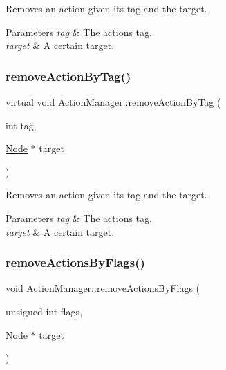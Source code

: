 Removes an action given its tag and the target.


\begin{DoxyParams}{Parameters}
{\em tag} & The action\textquotesingle{}s tag. \\
\hline
{\em target} & A certain target. \\
\hline
\end{DoxyParams}
\mbox{\label{classActionManager_a69aa53f99fdfdc4777119fb4a415cf81}} 
\subsubsection{\texorpdfstring{remove\+Action\+By\+Tag()}{removeActionByTag()}\hspace{0.1cm}{\footnotesize\ttfamily [2/2]}}
{\footnotesize\ttfamily virtual void Action\+Manager\+::remove\+Action\+By\+Tag (\begin{DoxyParamCaption}\item[{int}]{tag,  }\item[{\hyperlink{classNode}{Node} $\ast$}]{target }\end{DoxyParamCaption})\hspace{0.3cm}{\ttfamily [virtual]}}

Removes an action given its tag and the target.


\begin{DoxyParams}{Parameters}
{\em tag} & The action\textquotesingle{}s tag. \\
\hline
{\em target} & A certain target. \\
\hline
\end{DoxyParams}
\mbox{\label{classActionManager_aceccce766c59e57c201474ea7f121a67}} 
\subsubsection{\texorpdfstring{remove\+Actions\+By\+Flags()}{removeActionsByFlags()}\hspace{0.1cm}{\footnotesize\ttfamily [1/2]}}
{\footnotesize\ttfamily void Action\+Manager\+::remove\+Actions\+By\+Flags (\begin{DoxyParamCaption}\item[{unsigned int}]{flags,  }\item[{\hyperlink{classNode}{Node} $\ast$}]{target }\end{DoxyParamCaption})}

